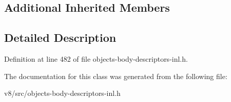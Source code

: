 \subsection*{Additional Inherited Members}


\subsection{Detailed Description}


Definition at line 482 of file objects-\/body-\/descriptors-\/inl.\+h.



The documentation for this class was generated from the following file\+:\begin{DoxyCompactItemize}
\item 
v8/src/objects-\/body-\/descriptors-\/inl.\+h\end{DoxyCompactItemize}
